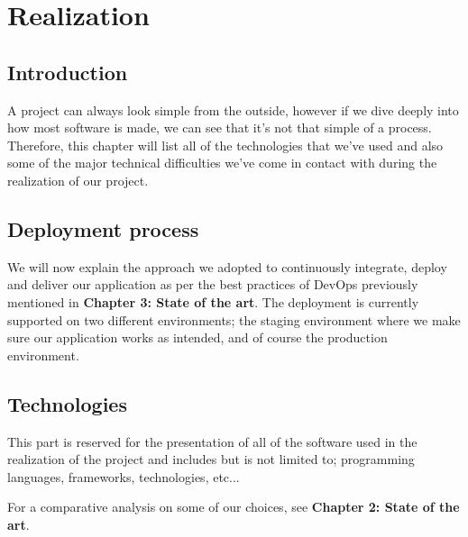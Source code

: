 \chapter{Realization}
\minitoc
\newpage

\setcounter{secnumdepth}{0} %
\section{Introduction}
A project can always look simple from the outside, however if we dive deeply into how most software is made, we can see that it's not that simple of a process.
Therefore, this chapter will list all of the technologies that we've used and also some of the major technical difficulties we've come in contact with during the realization of our project.

\setcounter{secnumdepth}{2} %
\section{Deployment process}
We will now explain the approach we adopted to continuously integrate, deploy and deliver our application as per the best practices of DevOps previously mentioned in \textbf{Chapter 3: State of the art}.
The deployment is currently supported on two different environments; the staging environment where we make sure our application works as intended, and of course the production environment.

\section{Technologies}
This part is reserved for the presentation of all of the software used in the realization of the project and includes but is not limited to; programming languages, frameworks, technologies, etc...

\medskip
For a comparative analysis on some of our choices, see \textbf {Chapter 2: State of the art}.

